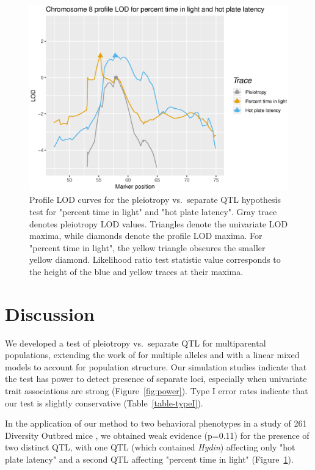 \documentclass[12pt,twoside, lineno]{gsajnl}
\begin{document}
\begin{figure}
\includegraphics[width = \textwidth]{../Rmd/profile.eps}
\caption{Profile LOD curves for the pleiotropy vs.\ separate QTL
  hypothesis test for "percent time in light" and "hot plate latency".
  Gray trace denotes pleiotropy LOD values. Triangles denote the
  univariate LOD maxima, while diamonds denote the profile LOD maxima.
  For "percent time in light", the yellow triangle obscures the
  smaller yellow diamond. Likelihood ratio test statistic value
  corresponds to the height of the blue and yellow traces at their
  maxima.}
\label{fig:profiles}
\end{figure}








\section{Discussion}

We developed a test of pleiotropy vs.\ separate QTL for multiparental
populations, extending the work of \citet{jiang1995multiple} for
multiple alleles and with a linear mixed models to account for
population structure. Our simulation
studies indicate that the test has power to detect presence of
separate loci, especially when univariate trait associations are
strong (Figure~\ref{fig:power}). Type I error rates indicate that our
test is slightly conservative (Table~\ref{table-typeI}).

In the application of our method to two behavioral phenotypes in a
study of 261 Diversity Outbred mice
\citep{recla2014precise,logan2013high}, we obtained weak evidence
(p=0.11) for the presence of two distinct QTL, with one QTL (which
contained \textit{Hydin}) affecting only "hot plate latency" and a
second QTL affecting "percent time in light" (Figure~\ref{fig:profiles}).
\end{document}
